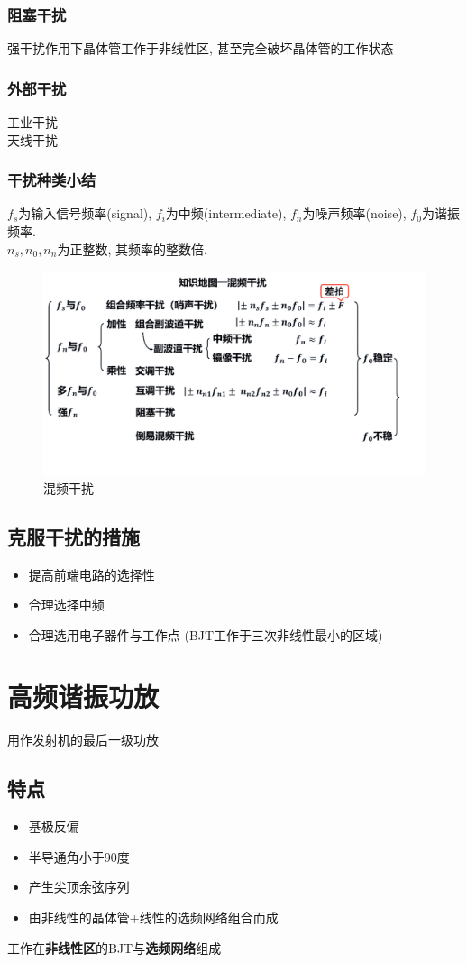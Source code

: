 \documentclass[a4paper]{report}
\begin{document}
\subsection{阻塞干扰}
强干扰作用下晶体管工作于非线性区, 甚至完全破坏晶体管的工作状态
\subsection{外部干扰}
工业干扰\\
天线干扰
\subsection{干扰种类小结}
$f_s$为输入信号频率(signal), $f_i$为中频(intermediate), $f_n$为噪声频率(noise), $f_0$为谐振频率. \\
$n_s,n_0,n_n$为正整数, 其频率的整数倍. 
\begin{figure}[H]
\centering
\includegraphics[width=\textwidth]{mix_noise_map.png}
\caption{混频干扰}
\end{figure}
\section{克服干扰的措施}
\begin{itemize}
  \item 提高前端电路的选择性
  \item 合理选择中频
  \item 合理选用电子器件与工作点 (BJT工作于三次非线性最小的区域)
\end{itemize}

\chapter{高频谐振功放}
用作发射机的最后一级功放
\section{特点}
\begin{itemize}
  \item 基极反偏
  \item 半导通角小于90度
  \item 产生尖顶余弦序列
  \item 由非线性的晶体管+线性的选频网络组合而成
\end{itemize}
工作在\textbf{非线性区}的BJT与\textbf{选频网络}组成
\end{document}
